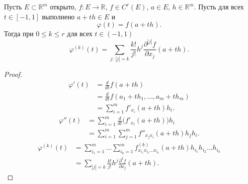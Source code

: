 \label{ticket:03}

\begin{lemma}
Пусть $E\subset\mathbb R^m$ открыто,
$f\colon E\to\mathbb R$, $f\in C^r(E)$, $a\in E$, $h\in\mathbb R^m$.
Пусть для всех $t\in[-1,1]$ выполнено $a+th\in E$ и
\[
  \varphi(t)=f(a+th).
\]
Тогда при $0\le k\le r$ для всех $t\in(-1,1)$
\[
  \varphi^{(k)}(t)
  =\sum_{j:\,|j|=k}\frac{k!}{j!}h^j
    \frac{\partial^{|j|}f}{\partial x_j}(a+th).
\]
\end{lemma}

\begin{proof}
\[
  \begin{aligned}
    \varphi'(t)
    &=\frac{d}{dt}f(a+th)\\
    &=\frac{d}{dt}f(a_1+th_1,\ldots,a_m+th_m)\\
    &=\sum_{i=1}^{m}f'_{x_i}(a+th)h_i.
  \end{aligned}
\]
\[
  \begin{aligned}
    \varphi''(t)
    &=\sum_{i=1}^{m}\frac{d}{dt}\bigl(f'_{x_i}(a+th)\bigr)h_i\\
    &=\sum_{i=1}^{m}\sum_{j=1}^{m}f''_{x_jx_i}(a+th)h_jh_i.
  \end{aligned}
\]
\[
  \begin{aligned}
    \varphi^{(k)}(t)
    &=\sum_{i_1=1}^{m}\ldots\sum_{i_k=1}^{m}
      f^{(k)}_{x_{i_1}x_{i_2}\ldots x_{i_k}}(a+th)
      h_{i_1}h_{i_2}\ldots h_{i_k}\\
    &=\sum_{|j|=k}\frac{k!}{j!}h^j
      \frac{\partial^k f}{\partial x_j}(a+th).
  \end{aligned}
\]
\end{proof}

